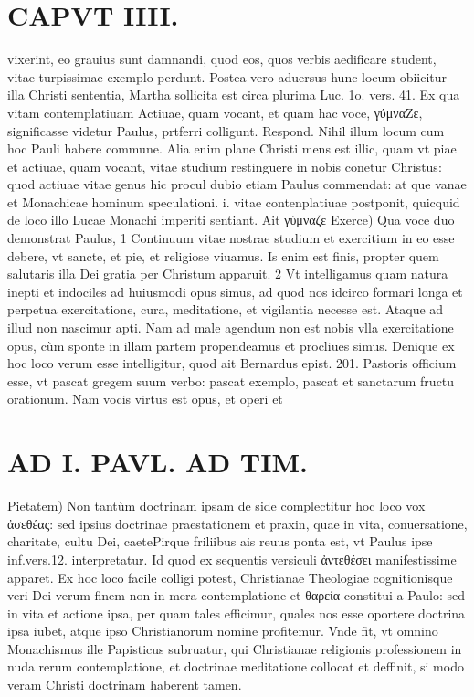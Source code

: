 \documentclass{article}
\begin{document}
\begin{pages}
\section*{CAPVT  IIII. }
\marginpar{[ p.205 ]}\pstart vixerint, eo grauius sunt damnandi, quod eos, quos verbis aedificare student, vitae turpissimae exemplo perdunt. Postea vero aduersus hunc locum obiicitur illa Christi sententia, Martha sollicita est circa plurima Luc. 1o. vers. 41. Ex qua vitam contemplatiuam Actiuae, quam vocant, et quam hac voce, γύμναZε, significasse videtur Paulus, prtferri colligunt. Respond. Nihil illum locum cum hoc Pauli habere commune. Alia enim plane Christi mens est illic, quam vt piae et actiuae, quam vocant, vitae studium restinguere in nobis conetur Christus: quod actiuae vitae genus hic procul dubio etiam Paulus commendat: at que vanae et Monachicae hominum speculationi. i. vitae contenplatiuae postponit, quicquid de loco illo Lucae Monachi imperiti sentiant.  \pend\pstart Ait γύμναζε Exerce) Qua voce duo demonstrat Paulus, 1 Continuum vitae nostrae studium et exercitium in eo esse debere, vt sancte, et pie, et religiose viuamus. Is enim est finis, propter quem salutaris illa Dei gratia per Christum apparuit. 2 Vt intelligamus quam natura inepti et indociles ad huiusmodi opus simus, ad quod nos idcirco formari longa et perpetua exercitatione, cura, meditatione, et vigilantia necesse est. Ataque ad illud non nascimur apti. Nam ad male agendum non est nobis vlla exercitatione opus, cùm sponte in illam partem propendeamus et procliues simus. Denique ex hoc loco verum esse intelligitur, quod ait Bernardus epist. 201. Pastoris officium esse, vt pascat gregem suum verbo: pascat exemplo, pascat et sanctarum fructu orationum. Nam vocis virtus est opus, et operi et  \pend
\section*{AD I. PAVL. AD TIM. }
\marginpar{[ p.206 ]}\pstart Pietatem) Non tantùm doctrinam ipsam de side complectitur hoc loco vox ἀσεθέας: sed ipsius doctrinae praestationem et praxin, quae in vita, conuersatione, charitate, cultu Dei, caetePirque friliibus ais reuus ponta est, vt Paulus ipse inf.vers.12. interpretatur. Id quod ex sequentis versiculi ἀντεθέσει manifestissime apparet.  \pend\pstart Ex hoc loco facile colligi potest, Christianae Theologiae cognitionisque veri Dei verum finem non in mera contemplatione et θαρεία constitui a Paulo: sed in vita et actione ipsa, per quam tales efficimur, quales nos esse oportere doctrina ipsa iubet, atque  ipso Christianorum nomine profitemur. Vnde fit, vt omnino Monachismus ille Papisticus subruatur, qui Christianae religionis professionem in nuda rerum contemplatione, et doctrinae meditatione collocat et deffinit, si modo veram Christi doctrinam haberent tamen.  \pend
{}
{}

\end{pages}
\end{document}
